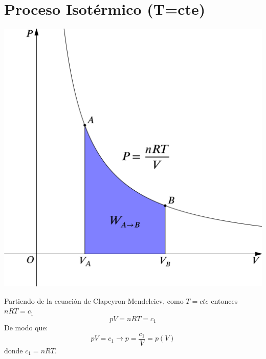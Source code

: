 \documentclass[../main]{subfiles}
\begin{document}
\section{Proceso Isotérmico (T=cte)}
\begin{minipage}{0.5\textwidth}
    \includegraphics[scale=0.14]{Termodinámica/images/isotermico.png}
\end{minipage}
\begin{minipage}{0.5\textwidth}
    Partiendo de la ecuación de Clapeyron-Mendeleiev, como $T=cte$ entonces $nRT=c_1$
    \begin{equation*}
        pV=nRT=c_1
    \end{equation*}
    De modo que:
    \begin{equation}
        pV=c_1 \rightarrow p=\dfrac{c_1}{V}=p(V)
    \end{equation}
    donde $c_1=nRT$.
\end{minipage}
\end{document}
